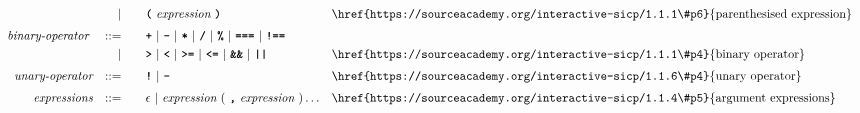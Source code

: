 \begin{alignat*}{9}
&&                       && |   &\quad &&  \textbf{\texttt{(}}\  \textit{expression} \ 
                                            \textbf{\texttt{)}} && \textrm{\href{https://sourceacademy.org/interactive-sicp/1.1.1\#p6}{parenthesised expression}}\\[1mm]
&& \textit{binary-operator}    \ 
                        && ::= &\quad && \textbf{\texttt{+}}\ |\ \textbf{\texttt{-}}\ |\ \textbf{\texttt{*}}\ |\ \textbf{\texttt{/}}\ |\ \textbf{\texttt{\%}}\ |\ 
                                   \textbf{\texttt{===}}\ |\ \textbf{\texttt{!==}}\ \\
&&                       && |  &\quad &&  \texttt{\textbf{>}}\ |\ \texttt{\textbf{<}}\ |\ \texttt{\textbf{>=}}\ |\ \texttt{\textbf{<=}}\
                                          |\ \textbf{\texttt{\&\&}}\ |\ \texttt{\textbf{||}}
                                          && \textrm{\href{https://sourceacademy.org/interactive-sicp/1.1.1\#p4}{binary operator}}\\[1mm]
&& \textit{unary-operator}    
                        && ::= &\quad && \textbf{\texttt{!}}\ |\ \textbf{\texttt{-}}
                        && \textrm{\href{https://sourceacademy.org/interactive-sicp/1.1.6\#p4}{unary operator}}\\[1mm]
&& \textit{expressions}  && ::= &\quad && \epsilon\ | \ \textit{expression}\ (
                                                               \ \textbf{\texttt{,}} \
                                                                 \textit{expression} \ 
                                                                      ) \ldots
                                                            && \textrm{\href{https://sourceacademy.org/interactive-sicp/1.1.4\#p5}{argument expressions}} 
\end{alignat*}
